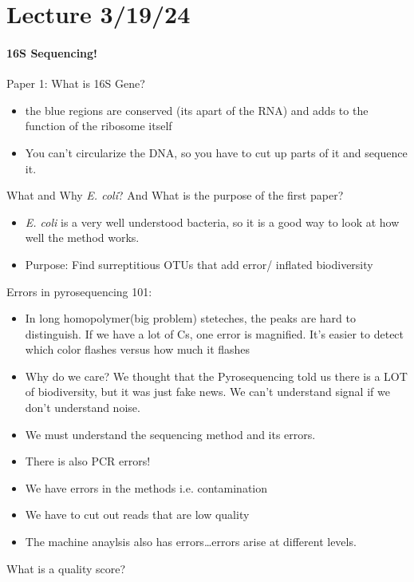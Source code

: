\documentclass[../main.tex]{subfiles}
\begin{document}
\newpage
\section*{Lecture 3/19/24}

\paragraph*{16S Sequencing!} Paper 1:
What is 16S Gene?
\begin{itemize}
    \item the blue regions are conserved (its apart of the RNA) and adds to the function of the 
    ribosome itself
    \item You can't circularize the DNA, so you have to cut up parts of it and sequence it.
\end{itemize}
What and Why \textit{E. coli}? And What is the purpose of the first paper?
\begin{itemize}
    \item \textit{E. coli} is a very well understood bacteria, so it is a good way to look at how well
    the method works.
    \item Purpose: Find surreptitious OTUs that add error/ inflated biodiversity
\end{itemize}
Errors in pyrosequencing 101:
\begin{itemize}
    \item In long homopolymer(big problem) steteches, the peaks are hard to distinguish. If we have a lot of Cs,
    one error is magnified. It's easier to detect which color flashes versus how much it flashes
    \item Why do we care? We thought that the Pyrosequencing told us there is a LOT of biodiversity,
    but it was just fake news. We can't understand signal if we don't understand noise.
    \item We must understand the sequencing method and its errors.
    \item There is also PCR errors! 
    \item We have errors in the methods i.e. contamination
    \item We have to cut out reads that are low quality
    \item The machine anaylsis also has errors\dots errors arise at different levels.
\end{itemize}
What is a quality score?
\end{document}
